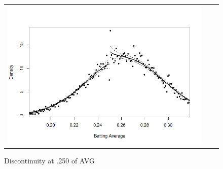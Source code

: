 \documentclass[dvipdfmx, 12pt]{article}
\begin{document}
\begin{figure}
\begin{tabular}{ccc}
{    \begin{minipage}{.4\textwidth}
      \includegraphics[keepaspectratio, scale = 0.5, angle = 0]{graphs/AVG_250.png}
      \caption{Discontinuity at .250 of AVG}
      \label{DCdensity_AVG_250}
    \end{minipage}
    }
  \end{tabular}
\end{figure}
\end{document}
